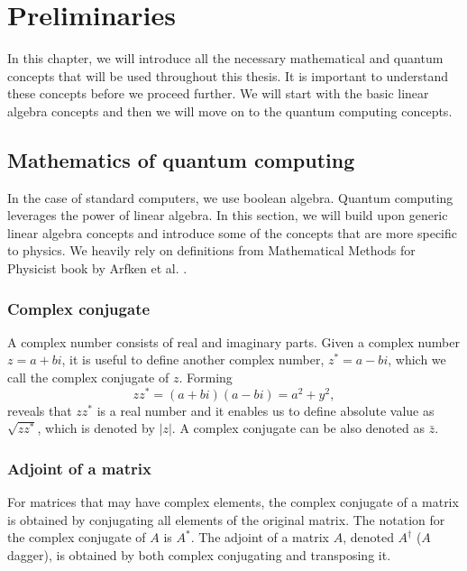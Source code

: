 \graphicspath{ {../images/}}

\chapter{Preliminaries}\label{ch:preliminaries}
In this chapter, we will introduce all the necessary mathematical and quantum concepts that will be used throughout this thesis. It is important to understand these concepts before we proceed further. We will start with the basic linear algebra concepts and then we will move on to the quantum computing concepts.
\section{Mathematics of quantum computing}
In the case of standard computers, we use boolean algebra. Quantum computing leverages the power of linear algebra. In this section, we will build upon generic linear algebra concepts and introduce some of the concepts that are more specific to physics. We heavily rely on definitions from Mathematical Methods for Physicist book by Arfken et al. \cite{mmp}.

\subsection{Complex conjugate}
A complex number consists of real and imaginary parts. Given a complex number $z = a + bi$, it is useful to define another complex number, $z^{*} = a - bi$, which we call the complex conjugate of $z$. Forming
$$zz^{*} = (a + bi)(a - bi) = a^2 + y^2,$$ reveals that $zz^{*}$ is a real number and it enables us to define absolute value as $\sqrt{zz^{*}}$, which is denoted by $\lvert z \rvert$. A complex conjugate can be also denoted as $\bar{z}$.

\subsection{Adjoint of a matrix}
For matrices that may have complex elements, the complex conjugate of a matrix is obtained by conjugating all elements of the original matrix. The notation for the complex conjugate of $A$ is $A^*$. The adjoint of a matrix $A$, denoted $A^\dag$ ($A$ dagger), is obtained by both complex conjugating and transposing it.

